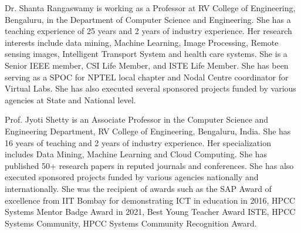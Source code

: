 \documentclass{ieeeaccess}
\begin{document}
\vspace{-4.5cm}
\begin{IEEEbiography}{Dr. Shanta Rangaswamy} is working as a Professor at RV College of Engineering, Bengaluru, in the Department of Computer Science and Engineering. She has a teaching experience of 25 years and 2 years of industry experience. Her research interests include data mining, Machine Learning, Image Processing, Remote sensing images, Intelligent Transport System and health care systems. She is a Senior IEEE member, CSI Life Member, and ISTE Life Member. She has been serving as a SPOC for NPTEL local chapter and Nodal Centre coordinator for Virtual Labs. She has also executed several sponsored projects funded by various agencies at State and National level.
    \end{IEEEbiography}


\vspace{-4.5cm}
\begin{IEEEbiography}{Prof. Jyoti Shetty} is an Associate Professor in the Computer Science and Engineering Department, RV College of Engineering, Bengaluru, India. She has 16 years of teaching and 2 years of industry experience. Her specialization includes Data Mining, Machine Learning and Cloud Computing. She has published 50+ research papers in reputed journals and conferences. She has also executed sponsored projects funded by various agencies nationally and internationally. She was the recipient of awards such as the SAP Award of excellence from IIT Bombay for demonstrating ICT in education in 2016, HPCC Systems Mentor Badge Award in 2021, Best Young Teacher Award ISTE, HPCC Systems Community, HPCC Systems Community Recognition Award.
    \end{IEEEbiography}


\setlength{\parskip}{\baselineskip}

\EOD
\end{document}
